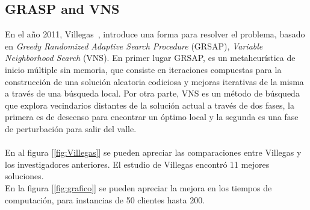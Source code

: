 \documentclass[letter, 10pt]{article}
\begin{document}
\subsection{GRASP and VNS}
En el año 2011, Villegas~\cite{Villegas}, introduce una forma para resolver el problema, basado en \textit{Greedy Randomized Adaptive Search Procedure} (GRSAP), \textit{Variable Neighborhood Search} (VNS). En primer lugar GRSAP, es un metaheurística de inicio múltiple sin memoria, que consiste en iteraciones compuestas para la construcción de una solución aleatoria codiciosa y mejoras iterativas de la misma a través de una búsqueda local. Por otra parte, VNS es un método de búsqueda que explora vecindarios distantes de la solución actual a través de dos fases, la primera es de descenso para encontrar un óptimo local y la segunda es una fase de perturbación para salir del valle.
\\
\\
En al figura [\ref{fig:Villegas}] se pueden apreciar las comparaciones entre Villegas y los investigadores anteriores. El estudio de Villegas encontró 11 mejores soluciones.\\ En la figura [\ref{fig:grafico}] se pueden apreciar la mejora en los tiempos de computación, para instancias de 50 clientes hasta 200.
\end{document}
